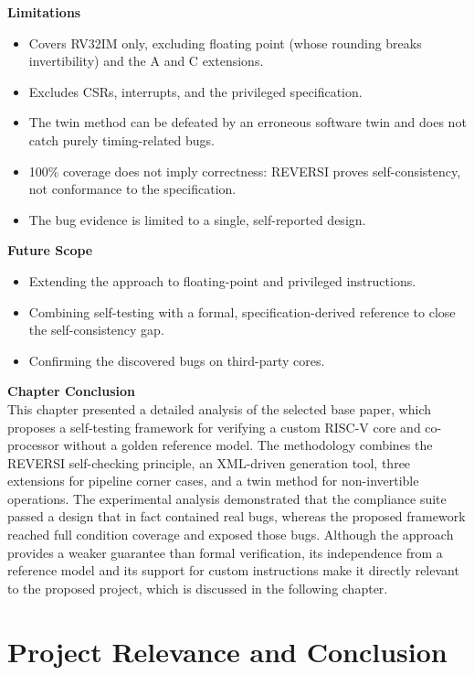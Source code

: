 \documentclass[12pt,a4paper]{report}
\begin{document}
\noindent\textbf{Limitations}
\begin{itemize}[nosep]
  \item Covers RV32IM only, excluding floating point (whose rounding breaks
        invertibility) and the A and C extensions.
  \item Excludes CSRs, interrupts, and the privileged specification.
  \item The twin method can be defeated by an erroneous software twin and does not catch
        purely timing-related bugs.
  \item 100\% coverage does not imply correctness: REVERSI proves self-consistency, not
        conformance to the specification.
  \item The bug evidence is limited to a single, self-reported design.
\end{itemize}

\noindent\textbf{Future Scope}
\begin{itemize}[nosep]
  \item Extending the approach to floating-point and privileged instructions.
  \item Combining self-testing with a formal, specification-derived reference to close
        the self-consistency gap.
  \item Confirming the discovered bugs on third-party cores.
\end{itemize}

\vspace{0.3cm}
\noindent\textbf{Chapter Conclusion}\\[2pt]
This chapter presented a detailed analysis of the selected base paper, which proposes a
self-testing framework for verifying a custom RISC-V core and co-processor without a golden
reference model. The methodology combines the REVERSI self-checking principle, an
XML-driven generation tool, three extensions for pipeline corner cases, and a twin method
for non-invertible operations. The experimental analysis demonstrated that the compliance
suite passed a design that in fact contained real bugs, whereas the proposed framework
reached full condition coverage and exposed those bugs. Although the approach provides a
weaker guarantee than formal verification, its independence from a reference model and its
support for custom instructions make it directly relevant to the proposed project, which is
discussed in the following chapter.

\chapter{Project Relevance and Conclusion}
\end{document}

